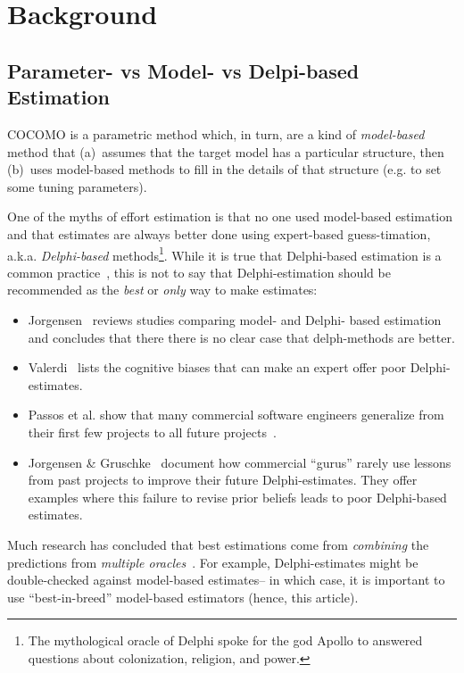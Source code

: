 \documentclass{sig-alternate}
\newcommand{\bi}{\begin{itemize}[leftmargin=0.4cm]}
\newcommand{\ei}{\end{itemize}}
\newenvironment{changed}{\par\color{MyDarkBlue}}{\par}
\begin{document}
\section{Background}





\subsection{Parameter- vs Model- vs Delpi-based Estimation}

\begin{changed}

COCOMO is a parametric method which, in turn,
are  a  kind of {\em model-based} method that (a)~assumes that the target model has a particular structure,
then (b)~uses model-based methods to fill in the details of that structure (e.g. to set some tuning parameters).


One of the myths of effort estimation is that no one used model-based estimation and that
estimates are always better done using expert-based guess-timation, a.k.a. {\em Delphi-based} methods\footnote{The mythological oracle of Delphi spoke for the god Apollo to answered questions  about colonization, religion, and power.}.
While it is true that Delphi-based estimation is a common practice~\cite{boehm00a}, this is not to say that Delphi-estimation should be recommended as the {\em best} or {\em only} way to make estimates:
\bi 
\item
Jorgensen~\cite{Jorgensen2004} reviews studies 
comparing  model- and Delphi- based estimation and concludes that there
there is no clear case that delph-methods are better.
\item 
Valerdi~\cite{valerdi11} lists the
cognitive biases that can make an expert offer poor Delphi-estimates.
\item Passos et al. show that many
commercial software engineers generalize from their
first few projects to all future
projects~\cite{passos11}.
\item
Jorgensen \& Gruschke~\cite{jorgensen09} document how
  commercial  ``gurus'' rarely use lessons
  from past projects to improve their future Delphi-estimates. 
 They offer examples where this
  failure to revise prior beliefs   leads to poor
 Delphi-based estimates.
  \ei 
Much research has concluded that best    estimations come from {\em combining} the predictions
from {\em multiple oracles}~\cite{koc11a,chulani99,baker07,valerdi11}.  
For example, Delphi-estimates might be double-checked against model-based estimates-- in
which case, it is important to use ``best-in-breed'' model-based estimators (hence, this
article).


\end{changed}
\end{document}
